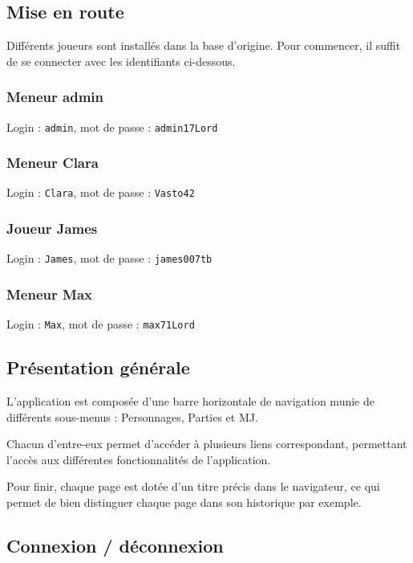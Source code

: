 \documentclass[a4paper, 11pt, titlepage]{article}
\begin{document}
\subsection {Mise en route}

Différents joueurs sont installés dans la base d'origine.
Pour commencer, il suffit de se connecter avec les identifiants ci-dessous.

\subsubsection {Meneur admin}

Login : \lstinline!admin!, mot de passe : \lstinline!admin17Lord!


\subsubsection {Meneur Clara}

Login : \lstinline!Clara!, mot de passe : \lstinline!Vasto42!


\subsubsection {Joueur James}

Login : \lstinline!James!, mot de passe : \lstinline!james007tb!


\subsubsection {Meneur Max}

Login : \lstinline!Max!, mot de passe : \lstinline!max71Lord!




\subsection {Présentation générale}

L'application est composée d'une barre horizontale de navigation munie de différents sous-menus : Personnages, Parties et MJ.

Chacun d'entre-eux permet d'accéder à plusieurs liens correspondant, permettant l'accès aux différentes fonctionnalités de l'application.

Pour finir, chaque page est dotée d'un titre précis dans le navigateur, ce qui permet de bien distinguer chaque page dans son historique par exemple.

\subsection {Connexion / déconnexion}
\end{document}
